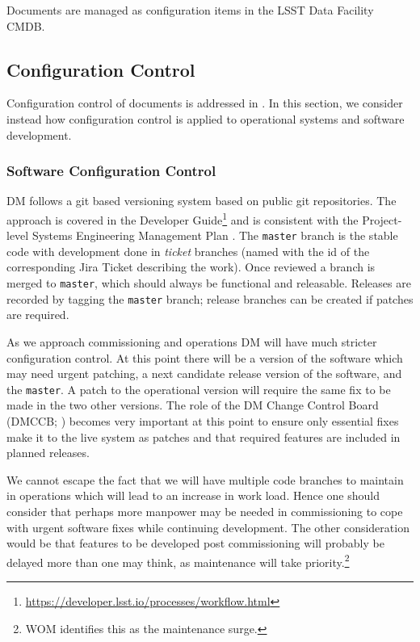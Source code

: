 Documents are managed as configuration items in the LSST Data Facility CMDB.

\subsection {Configuration Control} \label{sect:config}

Configuration control of documents is addressed in . In this section, we consider instead how configuration control is applied to operational systems and software development.

\subsubsection{Software Configuration Control}

DM follows a git based versioning system based on public git repositories.  The approach is covered in the Developer Guide\footnote{\url{https://developer.lsst.io/processes/workflow.html}} and is consistent with the Project-level Systems Engineering Management Plan .
The \texttt{master} branch is the stable code with development done in \emph{ticket} branches (named with the id of the corresponding Jira Ticket describing the work).
Once reviewed a branch is merged to \texttt{master}, which should always be functional and releasable.
Releases are recorded by tagging the \texttt{master} branch; release branches can be created if patches are required.

As we approach commissioning and operations DM will have much stricter configuration control.
At this point there will be a version of the software which may need urgent patching, a next candidate release version of the software, and the \texttt{master}.
A patch to the operational version will require the same fix to be made in the two other versions.
The role of the DM Change Control Board (DMCCB; ) becomes very important at this point to ensure only essential fixes make it to the live system as patches and that required features are included in planned releases.

We cannot escape the fact that we  will have multiple code branches to maintain in operations which will lead to an increase in work load.
Hence one should consider that perhaps more manpower may be needed in commissioning to cope with urgent software fixes while continuing development.
The other consideration would be that features to be developed post commissioning will probably be delayed more than one may think, as maintenance will take priority.\footnote{WOM identifies this as the maintenance surge.}

